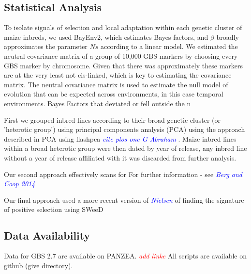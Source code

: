 \documentclass[9pt,twocolumn,twoside]{gsajnl}
\newcommand{\jri}[1]{\textcolor{red}{ \emph{ #1}} }
\newcommand{\kc}[1]{\textcolor{blue}{ \emph{ #1}} }
\begin{document}
\subsection*{Statistical Analysis} 
To isolate signals of selection and local adaptation within each genetic cluster of maize inbreds,  we used BayEnv2, which estimates Bayes factors, and $\beta$ broadly approximates the parameter $Ns$ according to a linear model. 
We estimated the neutral covariance matrix of a group of 10,000 GBS markers by choosing every  GBS marker by chromosome. Given that there was approximately  these markers are at the very least not cis-linked, which is key to estimating the covariance matrix. 
The neutral covariance matrix is used to estimate the null model of evolution that can be expected across environments, in this case temporal environments. 
Bayes Factors that deviated or fell outside the n

First we grouped inbred lines according to their broad genetic cluster (or 'heterotic group') using principal components analysis (PCA) using the approach described in 
PCA using flashpca \kc{cite plos one G Abraham}.  
Maize inbred lines within a broad heterotic group were then dated by year of release, any inbred line without a year of release affiliated with it was discarded from further analysis.

Our second approach effectively scans for  For further information - see \kc{Berg and Coop 2014}

Our final approach used a more recent version of \kc{Nielsen} of finding the signature of positive selection using SWeeD

\subsection*{Data Availability}

Data for GBS 2.7 are available on PANZEA.\jri{add linke} All scripts are available on github (give directory).

\end{document}
